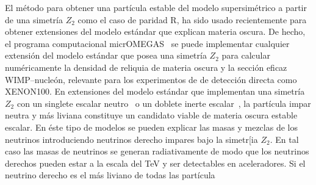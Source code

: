 El método para obtener una partícula estable del modelo supersimétrico
a partir de una simetría $Z_2$ como el caso de paridad R, ha sido
usado recientemente para obtener extensiones del modelo estándar que
explican materia oscura. De hecho, el programa computacional
micrOMEGAS~\cite{Belanger:2006is} se puede implementar cualquier
extensión del modelo estándar que posea una simetría $Z_2$ para
calcular numéricamente la densidad de reliquia de materia oscura y la
sección eficaz WIMP--nucleón, relevante para los experimentos de de
detección directa como XENON100. En extensiones del modelo estándar
que implementan una simetría $Z_2$ con un singlete escalar
neutro~\cite{Yaguna:2008hd,Goudelis:2009zz,Yaguna:2011qn} o un doblete
inerte escalar~\cite{}, la partícula impar neutra y más liviana
constituye un candidato viable de materia oscura estable escalar. En éste tipo de modelos se pueden explicar las masas y mezclas de los neutrinos introduciendo neutrinos derecho impares bajo la simetr[ia $Z_2$. En tal caso las masas de neutrinos se generan radiativamente de modo que los neutrinos derechos pueden estar a la escala del TeV y ser detectables en aceleradores. Si el neutrino derecho es el más liviano de todas las partícula 


